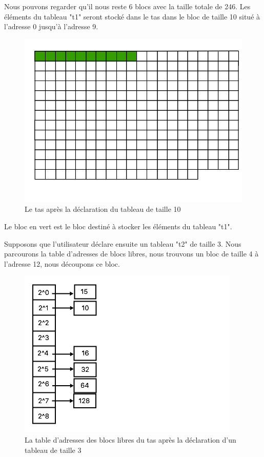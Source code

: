 \documentclass[a4paper,12pt]{report}
\begin{document}
Nous pouvons regarder qu'il nous reste 6 blocs avec la taille totale de 246. Les éléments du tableau "t1" seront stocké dans le tas dans le bloc de taille 10 situé à l'adresse 0 jusqu'à l'adresse 9.

\begin{figure}[H]
\begin{center}
	\includegraphics[scale=0.4]{tas2}
	\caption{Le tas après la déclaration du tableau de taille 10}
\end{center}
\end{figure}

Le bloc en vert est le bloc destiné à stocker les éléments du tableau "t1".

Supposons que l'utilisateur déclare ensuite un tableau "t2" de taille 3. Nous parcourons la table d'adresses de blocs libres, nous trouvons un bloc de taille 4 à l'adresse 12, nous découpons ce bloc.

\begin{figure}[H]
\begin{center}
	\includegraphics[scale=0.5]{adress3}
	\caption{La table d'adresses des blocs libres du tas après la déclaration d'un tableau de taille 3}
\end{center}
\end{figure}
\end{document}
